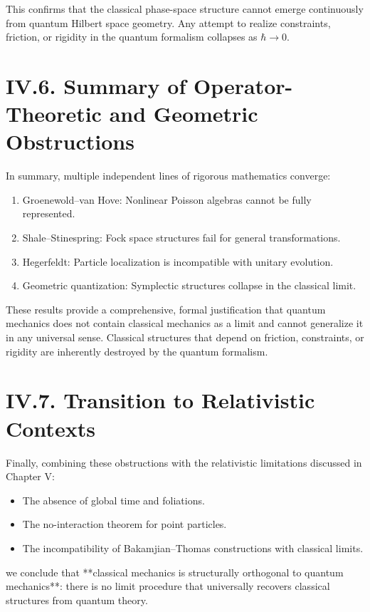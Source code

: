 \documentclass[12pt,oneside]{book}
\theoremstyle{plain}
\theoremstyle{definition}
\begin{document}
This confirms that the classical phase-space structure cannot emerge continuously from quantum Hilbert space geometry. Any attempt to realize constraints, friction, or rigidity in the quantum formalism collapses as $\hbar\to 0$.

\section{IV.6. Summary of Operator-Theoretic and Geometric Obstructions}

In summary, multiple independent lines of rigorous mathematics converge:

\begin{enumerate}
    \item Groenewold–van Hove: Nonlinear Poisson algebras cannot be fully represented.
    \item Shale–Stinespring: Fock space structures fail for general transformations.
    \item Hegerfeldt: Particle localization is incompatible with unitary evolution.
    \item Geometric quantization: Symplectic structures collapse in the classical limit.
\end{enumerate}

These results provide a comprehensive, formal justification that quantum mechanics does not contain classical mechanics as a limit and cannot generalize it in any universal sense. Classical structures that depend on friction, constraints, or rigidity are inherently destroyed by the quantum formalism.

\section{IV.7. Transition to Relativistic Contexts}

Finally, combining these obstructions with the relativistic limitations discussed in Chapter V:

\begin{itemize}
    \item The absence of global time and foliations.
    \item The no-interaction theorem for point particles.
    \item The incompatibility of Bakamjian–Thomas constructions with classical limits.
\end{itemize}

we conclude that **classical mechanics is structurally orthogonal to quantum mechanics**: there is no limit procedure that universally recovers classical structures from quantum theory. 
\end{document}
